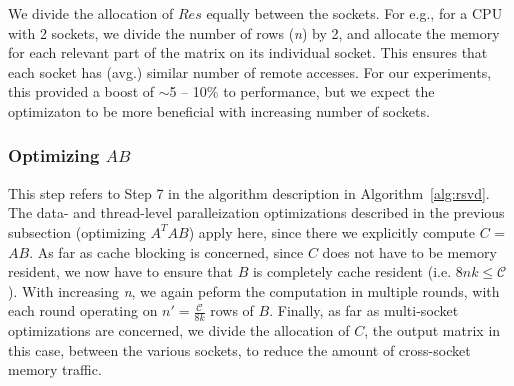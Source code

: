      We divide the allocation of $Res$ equally between
     the sockets. For e.g., for a CPU with 2 sockets, we divide the
     number of rows ({\it{n}}) by 2, and allocate the memory for each
     relevant part of the matrix on its individual socket. This
     ensures that %
     each socket has (avg.) similar number of
     remote accesses. For our experiments, this
     provided a boost of
     $\sim$5 -- 10\% to performance, but we expect the optimizaton
     to be more beneficial with increasing number of
     sockets.
     
     







    




\subsubsection{Optimizing $AB$}

    This step refers to Step 7 in the algorithm description in
    Algorithm~\ref{alg:rsvd}. The data- and thread-level paralleization optimizations described 
    in the previous subsection (optimizing $A^TAB$) apply here, since
    there we explicitly  compute $C$ = $AB$. As far as cache blocking is
    concerned, since $C$ does not have to be memory resident, we now have
    to ensure that $B$ is completely cache resident (i.e. $8nk\le
    \mathcal{C}$). With increasing {\it{n}}, we again peform the
    computation in multiple rounds, with each round operating on 
    $n'=\frac{\mathcal{C}}{8k}$ rows of $B$.
    Finally, as far as multi-socket optimizations are concerned, we
    divide the allocation of $C$, the output matrix in this case,
    between the various sockets, to reduce the amount of cross-socket
    memory traffic.





